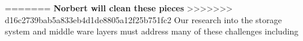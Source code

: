 =======
{\bf {\color{red}Norbert will clean these pieces}}
>>>>>>> d16c2739bab5a833eb4d1de8805a12f25b751fc2
Our research into the storage system and middle ware layers must address
many of these challenges including
